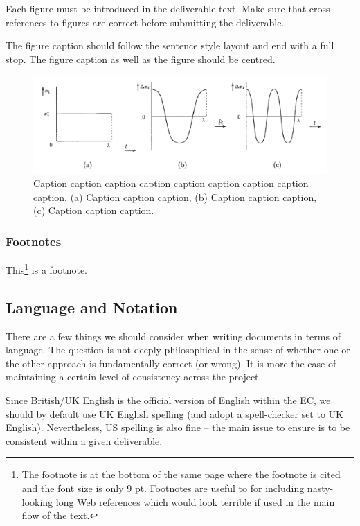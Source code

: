 Each figure must be introduced in the deliverable text. Make sure that cross references to figures are correct before submitting the deliverable.

The figure caption should follow the sentence style layout and end with a full stop. The figure caption as well as the figure should be centred.

\begin{figure}[htb]
	\centering
	\includegraphics[width=.89\linewidth]{graphics/figure}
	\caption{Caption caption caption caption caption caption caption caption caption. (a) Caption caption caption, (b) Caption caption caption, (c) Caption caption caption.}
	\label{fig:figure}
\end{figure}

\subsubsection{Footnotes}
\label{sec:footnotes}

This\footnote{The footnote is at the bottom of the same page where the footnote is cited and the font size is only 9 pt. Footnotes are useful to for including nasty-looking long Web references which would look terrible if used in the main flow of the text.} is a footnote.

\subsection{Language and Notation}
\label{sec:language-and_notation}

There are a few things we should consider when writing documents in terms of language. The question is not deeply philosophical in the sense of whether one or the other approach is fundamentally correct (or wrong). It is more the case of maintaining a certain level of consistency across the project.

Since British/UK English is the official version of English within the EC, we should by default use UK English spelling (and adopt a spell-checker set to UK English). Nevertheless, US spelling is also fine – the main issue to ensure is to be consistent within a given deliverable.

